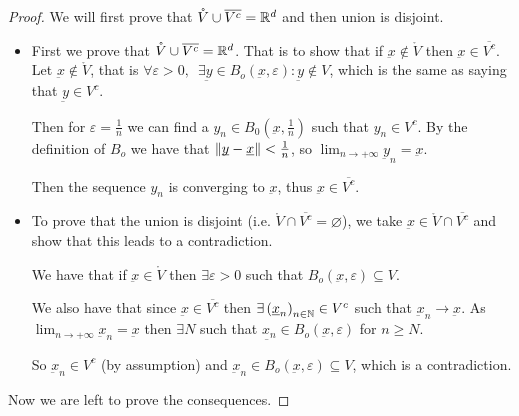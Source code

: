 \documentclass[10pt]{extarticle}
\renewcommand{\vec}[1]{\underbar{\ensuremath{#1}}}
\begin{document}
                \begin{proof}
                    We will first prove that $\mathring{V} \cup \overline{V^c} = \mathbb{R}^d$ and then union is disjoint.

                    \begin{itemize}
                        \item
                              First we prove that $\mathring{V} \cup \overline{V^c} = \mathbb{R}^d$. That is to show that if $\vec{x} \notin \mathring{V}$ then $\vec{x} \in \overline{V^c}$.
                              Let $\vec{x} \notin \mathring{V}$, that is
                              $\forall \varepsilon > 0, \enspace \exists \vec{y} \in B_o(\vec{x}, \varepsilon) : \vec{y} \notin V$, which is the same as saying that $\vec{y} \in V^c$.

                              Then for $\varepsilon = \frac{1}{n}$ we can find a $y_n \in B_0 \left(\vec{x}, \frac{1}{n} \right)$ such that $y_n \in V^c$.
                              By the definition of $B_o$ we have that $\norm{\vec{y} - \vec{x}} < \frac{1}{n}$, so $\lim_{n \to +\infty} \vec{y}_n = \vec{x}$.

                              Then the sequence $y_n$ is converging to $\vec{x}$, thus $\vec{x} \in \overline{V^c}$.

                        \item
                              To prove that the union is disjoint (i.e. $\mathring{V} \cap \overline{V^c} = \varnothing$), we take $\vec{x} \in \mathring{V} \cap \overline{V^c}$ and show that this leads to a contradiction.

                              We have that if $\vec{x} \in \mathring{V}$ then $\exists \varepsilon > 0$ such that $B_o(\vec{x}, \varepsilon) \subseteq V$.

                              We also have that since $\vec{x} \in \overline{V^c}$ then $\exists \left(\vec{x}_n\right)_{n \in \N} \in V^c$ such that $\vec{x}_n \to \vec{x}$.
                              As $\lim_{n \to +\infty} \vec{x}_n = \vec{x}$ then $\exists N$ such that $\vec{x_n} \in B_o(\vec{x}, \varepsilon)$ for $n \geq N$.

                              So $\vec{x}_n \in V^c$ (by assumption) and $\vec{x}_n \in B_o(\vec{x}, \varepsilon) \subseteq V$, which is a contradiction.
                    \end{itemize}

                    Now we are left to prove the consequences.


\end{proof}
\end{document}
